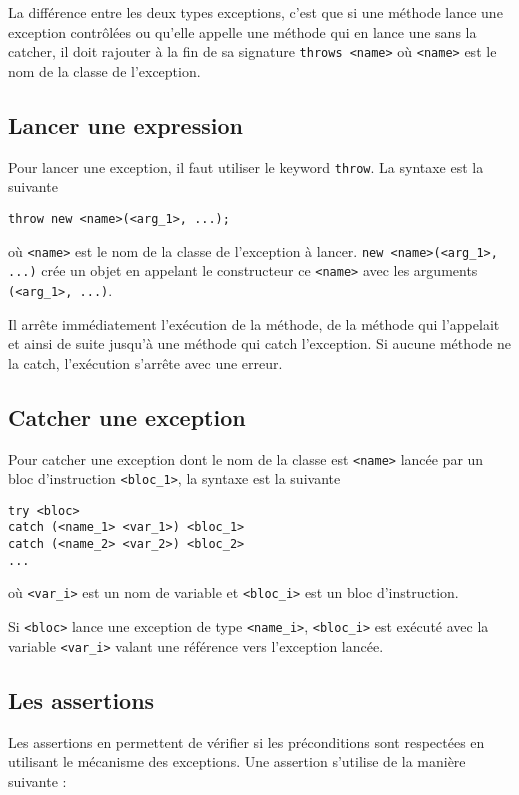 La différence entre les deux types exceptions, c'est que si une méthode
lance une exception contrôlées ou qu'elle appelle une méthode qui en
lance une sans la catcher, il doit rajouter à la fin de sa signature
\lstinline|throws <name>| où \lstinline|<name>| est le nom de la classe
de l'exception.

\subsection{Lancer une expression}
Pour lancer une exception, il faut utiliser le keyword \lstinline{throw}.
La syntaxe est la suivante
\begin{lstlisting}
throw new <name>(<arg_1>, ...);
\end{lstlisting}
où \lstinline|<name>| est le nom de la classe de l'exception à lancer.
\lstinline|new <name>(<arg_1>, ...)| crée un objet en appelant le constructeur
ce \lstinline|<name>| avec les arguments \lstinline|(<arg_1>, ...)|.

Il arrête immédiatement l'exécution de la méthode, de la méthode qui
l'appelait et ainsi de suite jusqu'à une méthode qui catch l'exception.
Si aucune méthode ne la catch, l'exécution s'arrête avec une erreur.

\subsection{Catcher une exception}
Pour catcher une exception dont le nom de la classe est \lstinline|<name>|
lancée par un bloc d'instruction \lstinline|<bloc_1>|,
la syntaxe est la suivante
\begin{lstlisting}
try <bloc>
catch (<name_1> <var_1>) <bloc_1>
catch (<name_2> <var_2>) <bloc_2>
...
\end{lstlisting}
où \lstinline|<var_i>| est un nom de variable et \lstinline|<bloc_i>|
est un bloc d'instruction.

Si \lstinline|<bloc>| lance une exception de type \lstinline|<name_i>|,
\lstinline|<bloc_i>| est exécuté avec la variable \lstinline|<var_i>|
valant une référence vers l'exception lancée.

\subsection{Les assertions}
Les assertions en \java{} permettent de vérifier si les préconditions sont respectées en utilisant le mécanisme des
exceptions. Une assertion s'utilise de la manière suivante :

